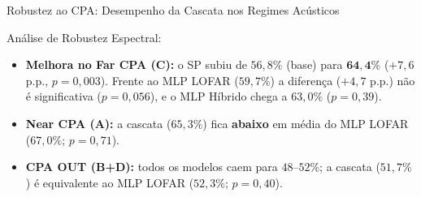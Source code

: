 \documentclass[aspectratio=169]{beamer}
\begin{document}
\begin{frame}{Robustez ao CPA: Desempenho da Cascata nos Regimes Ac\'{u}sticos}
    \begin{block}{\small An\'{a}lise de Robustez Espectral:}
        \scriptsize
        \begin{itemize}
            \setlength{\itemsep}{1pt}
            \item \textbf{Melhora no Far CPA (C):} o SP subiu de $56,8\%$ (base) para $\mathbf{64,4\%}$ ($+7,6$ p.p., $p=0,003$). Frente ao MLP LOFAR ($59,7\%$) a diferen\c{c}a ($+4,7$ p.p.) n\~{a}o \'{e} significativa ($p=0,056$), e o MLP H\'{i}brido chega a $63,0\%$ ($p=0,39$).
            \item \textbf{Near CPA (A):} a cascata ($65,3\%$) fica \textbf{abaixo} em m\'{e}dia do MLP LOFAR ($67,0\%$; $p=0,71$).
            \item \textbf{CPA OUT (B+D):} todos os modelos caem para $48$--$52\%$; a cascata ($51,7\%$) \'{e} equivalente ao MLP LOFAR ($52,3\%$; $p=0,40$).
        \end{itemize}
    \end{block}
\end{frame}
\end{document}

